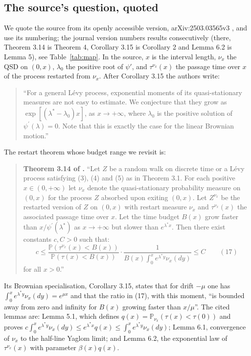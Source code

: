 \documentclass[11pt,a4paper]{article}
\theoremstyle{definition}
\theoremstyle{remark}
\newcommand{\Pp}{\mathbb P}
\newcommand{\1}{\mathbf 1}
\begin{document}
\subsection{The source's question, quoted}\label{sec:quote}
We quote the source from its openly accessible version, arXiv:2503.03565v3 \cite{garcia}, and use its numbering; the journal version numbers results consecutively (there, Theorem 3.14 is Theorem 4, Corollary 3.15 is Corollary 2 and Lemma 6.2 is Lemma 5), see Table~\ref{tab:map}. In the source, $x$ is the interval length, $\nu_x$ the QSD on $(0,x)$, $\lambda_0$ the positive root of $\psi'$, and $\tau^{\nu_x}(x)$ the passage time over $x$ of the process restarted from $\nu_x$. After Corollary 3.15 the authors write:
\begin{quote}\small
``For a general L\'evy process, exponential moments of its quasi-stationary measures are not easy to estimate. We conjecture that they grow as $\exp\left[(\lambda^{*}-\lambda_{0})x\right]$, as $x\to+\infty$, where $\lambda_{0}$ is the positive solution of $\psi^{\prime}(\lambda)=0$. Note that this is exactly the case for the linear Brownian motion.''
\end{quote}
The restart theorem whose budget range we revisit is:
\begin{quote}\small
\textbf{Theorem 3.14 of \cite{garcia}.} ``Let $Z$ be a random walk on discrete time or a L\'evy process satisfying (3), (4) and (5) as in Theorem 3.1. For each positive $x\in(0,+\infty)$ let $\nu_{x}$ denote the quasi-stationary probability measure on $(0,x)$ for the process $Z$ absorbed upon exiting $(0,x)$. Let $Z^{\nu_{x}}$ be the restarted version of $Z$ on $(0,x)$ with restart measure $\nu_{x}$ and $\tau^{\nu_{x}}(x)$ the associated passage time over $x$. Let the time budget $B(x)$ grow faster than $x/\psi^{\prime}(\lambda^{*})$ as $x\to+\infty$ but slower than $e^{\lambda^{*}x}$. Then there exist constants $c,C>0$ such that:
\[
c\leq\frac{\Pp(\tau^{\nu_{x}}(x)<B(x))}{\Pp(\tau(x)<B(x))}\cdot\frac{1}{B(x)\int_{0}^{x}e^{\lambda^{*}y}\nu_{x}(dy)}\leq C\qquad(17)
\]
for all $x>0$.''
\end{quote}
Its Brownian specialisation, Corollary 3.15, states that for drift $-\mu$ one has $\int_0^xe^{\lambda^*y}\nu_x(dy)=e^{\mu x}$ and that the ratio in (17), with this moment, ``is bounded away from zero and infinity for $B(x)$ growing faster than $x/\mu$''. The cited lemmas are: Lemma 5.1, which defines $q(x)=\Pp_{\nu_x}(\tau(x)<\tau(0))$ and proves $c\int_0^xe^{\lambda^*y}\nu_x(dy)\le e^{\lambda^*x}q(x)\le\int_0^xe^{\lambda^*y}\nu_x(dy)$; Lemma 6.1, convergence of $\nu_x$ to the half-line Yaglom limit; and Lemma 6.2, the exponential law of $\tau^{\nu_x}(x)$ with parameter $\beta(x)q(x)$.
\end{document}
